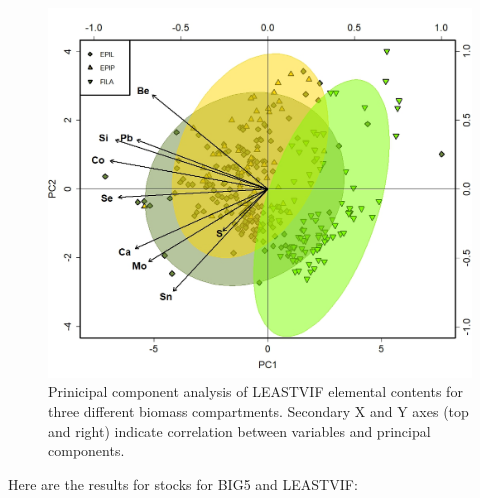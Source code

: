 \documentclass[
]{article}
\begin{document}
\begin{figure}
\includegraphics[width=1\linewidth]{Figures/PCA_1_LEASTVIF} \caption[Prinicipal component analysis of LEASTVIF elemental contents for three different biomass compartments]{Prinicipal component analysis of LEASTVIF elemental contents for three different biomass compartments. Secondary X and Y axes (top and right) indicate correlation between variables and principal components.}\label{fig:unnamed-chunk-11}
\end{figure}

\FloatBarrier

\newpage

Here are the results for stocks for BIG5 and LEASTVIF:
\end{document}
